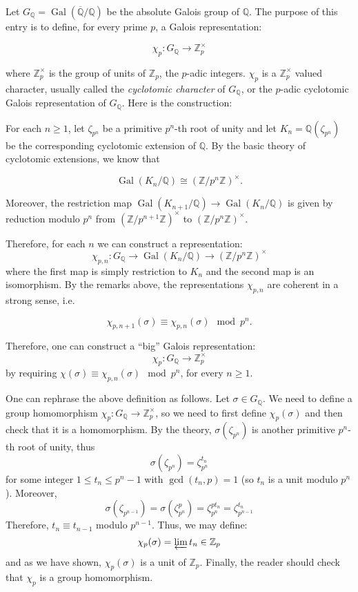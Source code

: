 \documentclass[12pt]{article}
\theoremstyle{definition}
\newcommand{\Ints}{\mathbb{Z}}
\newcommand{\Rats}{\mathbb{Q}}
\newcommand{\Gal}{\operatorname{Gal}}
\begin{document}
Let $G_{\Rats}=\Gal(\overline{\Rats}/\Rats)$ be the absolute Galois group of $\Rats$. The purpose of this entry is to define, for every prime $p$, a Galois representation:

$$\chi_p : G_{\Rats} \longrightarrow \Ints_p^\times$$

where $\Ints_p^\times$ is the group of units of $\Ints_p$, the $p$-adic integers. $\chi_p$ is a $\Ints_p^\times$ valued character, usually called the {\it cyclotomic character} of $G_{\Rats}$, or the $p$-adic cyclotomic Galois representation of $G_{\Rats}$. Here is the construction:

For each $n\geq 1$, let $\zeta_{p^n}$ be a primitive $p^n$-th root of unity and let $K_n=\Rats(\zeta_{p^n})$ be the corresponding cyclotomic extension of $\Rats$.  By the basic theory of cyclotomic extensions, we know that 

$$\Gal(K_n/\Rats)\cong (\Ints/p^n\Ints)^\times.$$

Moreover, the restriction map $\Gal(K_{n+1}/\Rats)\to \Gal(K_n/\Rats)$ is given by reduction modulo $p^n$ from $(\Ints/p^{n+1}\Ints)^\times$ to $(\Ints/p^n\Ints)^\times$.

Therefore, for each $n$ we can construct a representation:
$$\chi_{p,n} : G_{\Rats} \to \Gal(K_n/\Rats) \to (\Ints/p^n\Ints)^\times$$
where the first map is simply restriction to $K_n$ and the second map is an isomorphism. By the remarks above, the representations $\chi_{p,n}$ are coherent in a strong sense, i.e.

$$\chi_{p,n+1}(\sigma) \equiv \chi_{p,n}(\sigma) \mod p^n.$$

Therefore, one can construct a ``big'' Galois representation:
$$\chi_p : G_{\Rats} \longrightarrow \Ints_p^\times$$
by requiring $\chi(\sigma) \equiv \chi_{p,n}(\sigma) \mod p^n$, for every $n\geq 1$. 

One can rephrase the above definition as follows. Let $\sigma\in G_{\Rats}$. We need to define a group homomorphism $\chi_p:G_{\Rats} \to \Ints_p^\times$, so we need to first define $\chi_p(\sigma)$ and then check that it is a homomorphism. By the theory, $\sigma(\zeta_{p^n})$ is another primitive $p^n$-th root of unity, thus 
$$\sigma(\zeta_{p^n})=\zeta_{p^n}^{t_n}$$
for some integer $1\leq t_n \leq p^n-1$ with $\gcd(t_n,p)=1$ (so $t_n$ is a unit modulo $p^n$). Moreover, 
$$\sigma(\zeta_{p^{n-1}})=\sigma(\zeta_{p^{n}}^p)=\zeta_{p^n}^{pt_n}=\zeta_{p^{n-1}}^{t_n}$$
Therefore, $t_n \equiv t_{n-1}$ modulo $p^{n-1}$. Thus, we may define:
$$\chi_p(\sigma) = \varprojlim t_n \in \Ints_p$$
and as we have shown, $\chi_p(\sigma)$ is a unit of $\Ints_p$. Finally, the reader should check that $\chi_p$ is a group homomorphism.
\end{document}

